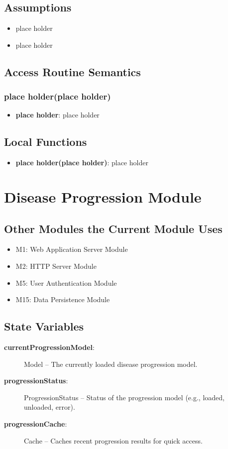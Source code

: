 \documentclass[12pt, titlepage]{article}
\begin{document}
\subsection{Assumptions}
\begin{itemize}
    \item place holder
    \item place holder
\end{itemize}


\subsection{Access Routine Semantics}
\subsubsection{place holder(place holder)}
\begin{itemize}
    \item \textbf{place holder}: place holder
\end{itemize}

\subsection{Local Functions}
\begin{itemize}
\item \textbf{place holder(place holder)}: place holder
\end{itemize}

\section{Disease Progression Module}
\label{Disease Progression Module}

\subsection{Other Modules the Current Module Uses}
\begin{itemize}
    \item M1: Web Application Server Module
    \item M2: HTTP Server Module
    \item M5: User Authentication Module
    \item M15: Data Persistence Module
\end{itemize}

\subsection{State Variables}
\begin{description}
    \item[\textbf{currentProgressionModel}:] Model -- The currently loaded disease progression model.
    \item[\textbf{progressionStatus}:] ProgressionStatus -- Status of the progression model (e.g., loaded, unloaded, error).
    \item[\textbf{progressionCache}:] Cache -- Caches recent progression results for quick access.
\end{description}
\end{document}
